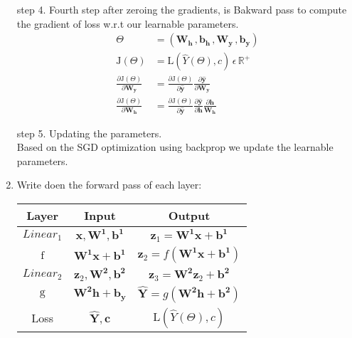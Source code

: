 \documentclass[letterpaper,11pt]{article}
\begin{document}
\begin{enumerate}
    step 4. Fourth step after zeroing the gradients, is Bakward pass to compute the gradient of loss w.r.t our
    learnable parameters.
    \begin{align}
        \Theta &= \left(\mathbf{W_h}\, , \mathbf{b_h} \,, \mathbf{W_y} \,, \mathbf{b_y}\right)\\
        \mathrm{J}(\Theta) &= \mathrm{L}(\hat{Y}(\Theta), c) \,\epsilon \, \mathbb{R}^{+} \\
        \frac{\partial \mathrm{J}(\Theta)}{\partial \mathbf{W_y}} &= \frac{\partial \mathrm{J}(\Theta)}
        {\partial \hat{\mathbf{y}}}\frac{\partial \hat{\mathbf{y}}}{\partial \mathbf{W_y}} \\
        \frac{\partial \mathrm{J}(\Theta)}{\partial \mathbf{W_h}} &= \frac{\partial \mathrm{J}(\Theta)}
        {\partial \hat{\mathbf{y}}}
        \frac{\partial \hat{\mathbf{y}}}{\partial {\mathbf{h}}}\frac{\partial {\mathbf{h}}}{\mathbf{W_h}}
    \end{align}

    step 5. Updating the parameters.\\
    Based on the SGD optimization using backprop we update the learnable parameters.

    \item Write doen the forward pass of each layer:
    \begin{center}
        \begin{tabular}{ |c|c|c| } 
         \hline
         Layer & Input & Output \\ 
         \hline
         $Linear_1$ & $\mathbf{x}, \mathbf{W^1} , \mathbf{b^1}$ & $ \textbf{z}_{1}= \mathbf{W^1}\mathbf{x} + \mathbf{b^1}$ \\ 
         \hline
         $\mathrm{f}$ & $\mathbf{W^1}\mathbf{x} + \mathbf{b^1}$ & $\textbf{z}_{2} = f(\mathbf{W^1}\mathbf{x} + \mathbf{b^1})$ \\ 
         \hline
         $Linear_2$ & $\textbf{z}_{2} , \mathbf{W^2} , \mathbf{b^2}$ & $\textbf{z}_{3}  = \mathbf{W^2}\textbf{z}_{2}  + \mathbf{b^2}$ \\ 
         \hline
         $\mathrm{g}$ & $\mathbf{W^2}\mathbf{h} + \mathbf{b_y}$ & $\hat{\textbf{Y}} = g(\mathbf{W^2}\mathbf{h} + \mathbf{b^2})$ \\ 
         \hline
         Loss & $\hat{\textbf{Y}} , \textbf{c}$ & $\mathrm{L}(\hat{Y}(\Theta), c)$ \\ 
         \hline
        \end{tabular}
        \end{center}


\end{enumerate}
\end{document}
